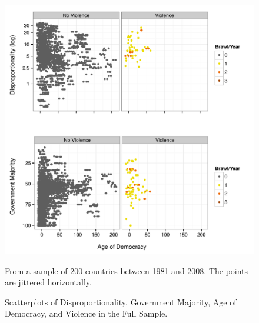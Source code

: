 \documentclass[a4paper]{article}\usepackage{graphicx, color}
\newenvironment{knitrout}{}{} %
\begin{document}
\begin{figure}[t]
    \caption{Scatterplots of Disproportionality, Government Majority, Age of Democracy, and Violence in the Full Sample.}  
    \label{framework_empirical}
    \begin{center}

\begin{knitrout}
\color{fgcolor}
\includegraphics[width=0.8\linewidth]{figure/FrameworkEmpirical} 

\end{knitrout}

    \end{center}
    \begin{singlespace}
        {\scriptsize{From a sample of 200 countries between 1981 and 2008. The points are jittered horizontally.}}
    \end{singlespace}

\end{figure}
\end{document}
